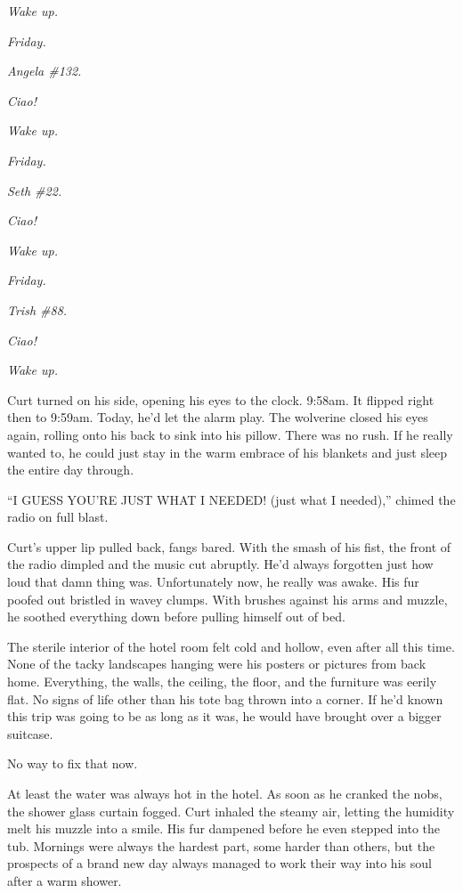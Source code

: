 \-\indent\emph{Wake up.}

\emph{Friday.}

\emph{Angela \#132.}

\emph{Ciao!}

\emph{Wake up.}

\emph{Friday.}

\emph{Seth \#22.}

\emph{Ciao!}

\emph{Wake up.}

\emph{Friday.}

\emph{Trish \#88.}

\emph{Ciao!}

\emph{Wake up.}

Curt turned on his side, opening his eyes to the clock. 9:58am. It flipped right then to 9:59am. Today, he'd let the alarm play. The wolverine closed his eyes again, rolling onto his back to sink into his pillow. There was no rush. If he really wanted to, he could just stay in the warm embrace of his blankets and just sleep the entire day through.

``I GUESS YOU'RE JUST WHAT I NEEDED! (just what I needed),'' chimed the radio on full blast.

Curt's upper lip pulled back, fangs bared. With the smash of his fist, the front of the radio dimpled and the music cut abruptly. He'd always forgotten just how loud that damn thing was. Unfortunately now, he really was awake. His fur poofed out bristled in wavey clumps. With brushes against his arms and muzzle, he soothed everything down before pulling himself out of bed.

The sterile interior of the hotel room felt cold and hollow, even after all this time. None of the tacky landscapes hanging were his posters or pictures from back home. Everything, the walls, the ceiling, the floor, and the furniture was eerily flat. No signs of life other than his tote bag thrown into a corner. If he'd known this trip was going to be as long as it was, he would have brought over a bigger suitcase.

No way to fix that now.

At least the water was always hot in the hotel. As soon as he cranked the nobs, the shower glass curtain fogged. Curt inhaled the steamy air, letting the humidity melt his muzzle into a smile. His fur dampened before he even stepped into the tub. Mornings were always the hardest part, some harder than others, but the prospects of a brand new day always managed to work their way into his soul after a warm shower.

